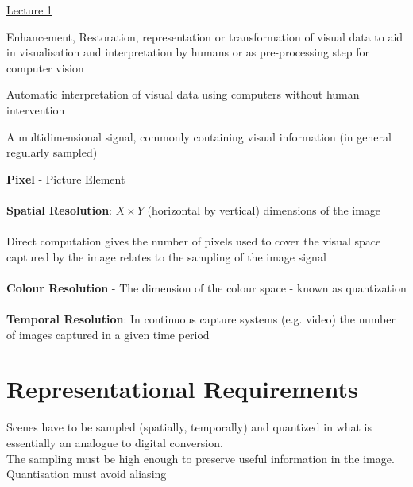 \documentclass{article}[18pt]
\begin{document}
\begin{center}
\underline{\huge Lecture 1}
\end{center}
\begin{defin}
Enhancement, Restoration, representation or transformation of visual data to aid in visualisation and interpretation by humans or as pre-processing step for computer vision	
\end{defin}
\begin{defin}
	Automatic interpretation of visual data using computers without human intervention	
\end{defin}
\begin{defin}[Image]
A multidimensional signal, commonly containing visual information (in general regularly sampled)	
\end{defin}

\textbf{Pixel} - Picture Element\\
\\
\textbf{Spatial Resolution}: $X\times Y$ (horizontal by vertical) dimensions of the image\\
\\
Direct computation gives the number of pixels used to cover the visual space captured by the image relates to the sampling of the image signal\\
\\
\textbf{Colour Resolution} - The dimension of the colour space - known as quantization\\
\\
\textbf{Temporal Resolution}: In continuous capture systems (e.g. video) the number of images captured in a given time period
\section{Representational Requirements}
Scenes have to be sampled (spatially, temporally) and quantized in what is essentially an analogue to digital conversion.\\
The sampling must be high enough to preserve useful information in the image. Quantisation must avoid aliasing
\end{document}
